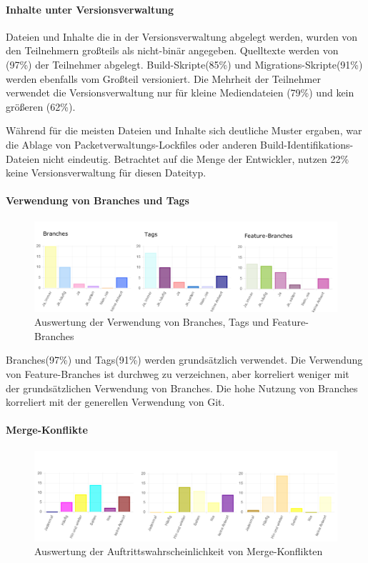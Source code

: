 \paragraph{Inhalte unter Versionsverwaltung}

Dateien und Inhalte die in der Versionsverwaltung abgelegt werden, wurden von den Teilnehmern großteils als nicht-binär angegeben. Quelltexte werden von (97\%) der Teilnehmer abgelegt. Build-Skripte(85\%) und Migrations-Skripte(91\%) werden ebenfalls vom Großteil versioniert. Die Mehrheit der Teilnehmer verwendet die Versionsverwaltung nur für kleine Mediendateien (79\%) und kein größeren (62\%).

Während für die meisten Dateien und Inhalte sich deutliche Muster ergaben, war die Ablage von Packetverwaltungs-Lockfiles oder anderen Build-Identifikations-Dateien nicht eindeutig. Betrachtet auf die Menge der Entwickler, nutzen 22\% keine Versionsverwaltung für diesen Dateityp.

\paragraph{Verwendung von Branches und Tags}

\begin{figure}[htbp]
  \includegraphics[width=\textwidth, height=\textheight, keepaspectratio]
    {resources/survey-vcs-branches.pdf}
  \caption{Auswertung der Verwendung von Branches, Tags und Feature-Branches}
\end{figure}

Branches(97\%) und Tags(91\%) werden grundsätzlich verwendet. Die Verwendung von Feature-Branches ist durchweg zu verzeichnen, aber korreliert weniger mit der grundsätzlichen Verwendung von Branches. Die hohe Nutzung von Branches korreliert mit der generellen Verwendung von Git.

\paragraph{Merge-Konflikte}

\begin{figure}[htbp]
  \includegraphics[width=\textwidth, height=\textheight, keepaspectratio]
    {resources/survey-vcs-merge.pdf}
  \caption{Auswertung der Auftrittswahrscheinlichkeit von Merge-Konflikten}
\end{figure}

